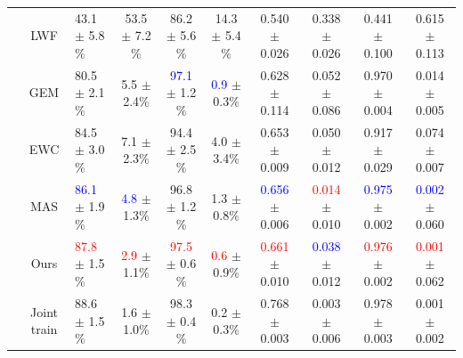 \documentclass[letterpaper]{article} %
\begin{document}
\begin{table}[]
{\begin{tabular}{c|c|lc|cc|cc|cc}
                                                                       & LWF                      & 43.1 $\pm$ 5.8$\%$ & 53.5 $\pm$ 7.2$\%$                          & 86.2 $\pm$ 5.6$\%$                           & 14.3 $\pm$ 5.4$\%$                           & 0.540 $\pm$ 0.026                           & 0.338 $\pm$ 0.026                           & 0.441 $\pm$ 0.100    & 0.615 $\pm$ 0.113                           \\
                                                                       & GEM                      & 80.5 $\pm$ 2.1$\%$ & 5.5 $\pm$ 2.4$\%$                           & \textcolor{blue}{97.1} $\pm$ 1.2$\%$                           & \textcolor{blue}{0.9}  $\pm$ 0.3$\%$                           & 0.628 $\pm$ 0.114                           & 0.052 $\pm$ 0.086                           & 0.970 $\pm$ 0.004    & 0.014 $\pm$ 0.005                            \\
                                                                                                           & EWC                      & 84.5 $\pm$ 3.0$\%$ & 7.1 $\pm$ 2.3$\%$                           & 94.4 $\pm$ 2.5$\%$                           & 4.0 $\pm$ 3.4$\%$                           & 0.653 $\pm$ 0.009                           & 0.050 $\pm$ 0.012                           & 0.917 $\pm$ 0.029    & 0.074 $\pm$ 0.007                           \\
                                                                                                           & MAS                      & \textcolor{blue}{86.1} $\pm$ 1.9$\%$ & \textcolor{blue}{4.8} $\pm$ 1.3$\%$                           & 96.8 $\pm$ 1.2$\%$                           & 1.3 $\pm$ 0.8$\%$                           & \textcolor{blue}{0.656} $\pm$ 0.006                           & \textcolor{red}{0.014} $\pm$ 0.010                           & \textcolor{blue}{0.975} $\pm$ 0.002    & \textcolor{blue}{0.002} $\pm$ 0.060                           \\
                                                                       & Ours                     & \textcolor{red}{87.8} $\pm$ 1.5$\%$ & \textcolor{red}{2.9} $\pm$ 1.1$\%$ & \textcolor{red}{97.5} $\pm$ 0.6$\%$ & \textcolor{red}{0.6} $\pm$ 0.9$\%$ & \textcolor{red}{0.661} $\pm$ 0.010 & \textcolor{blue}{0.038} $\pm$ 0.012 & \textcolor{red}{0.976} $\pm$ 0.002    & \textcolor{red}{0.001} $\pm$ 0.062 \\ %
                                                                       & Joint train              & 88.6 $\pm$ 1.5$\%$ & 1.6 $\pm$ 1.0$\%$                           & 98.3 $\pm$ 0.4$\%$                           & 0.2 $\pm$ 0.3$\%$                          & 0.768 $\pm$ 0.003                           & 0.003 $\pm$ 0.006                           & 0.978 $\pm$ 0.003    & 0.001 $\pm$ 0.002                           \\ \bottomrule

\end{tabular}}
\end{table}
\end{document}
